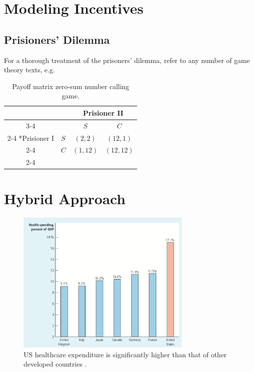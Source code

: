 \documentclass{article}
\begin{document}
\section*{Modeling Incentives}
\label{section:modeling}

\subsection*{Prisioners' Dilemma}
For a thorough treatment of the prisoners' dilemma, refer to any number of game theory texts, e.g. \cite{networks}

\begin{table}[H]
\centering
  \setlength{\extrarowheight}{2pt}
  \begin{tabular}{*{4}{c|}}
    \multicolumn{2}{c}{} & \multicolumn{2}{c}{Prisioner II}\\\cline{3-4}
    \multicolumn{1}{c}{} &  & $S$  & $C$ \\\cline{2-4}
    \multirow{2}*{Prisioner I}  & $S$ & $(2,2)$ & $(12,1)$ \\\cline{2-4}
    & $C$ & $(1,12)$ & $(12,12)$ \\\cline{2-4}
  \end{tabular}
\caption{Payoff matrix zero-sum number calling game.}
\end{table}

\section*{Hybrid Approach}




\begin{figure}
\includegraphics[height=7cm]{usspend}
\centering
\caption{US healthcare expenditure is significantly higher than that of other developed countries \cite{econharvard}.}
\label{fig:usspend}
\end{figure}
\end{document}
